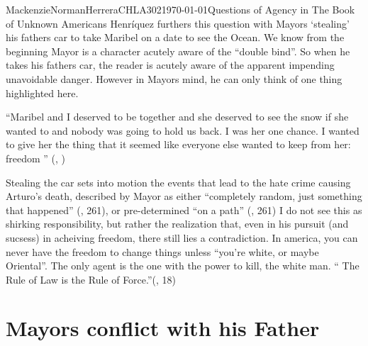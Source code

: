 \documentclass{article}
\begin{document}
\begin{mla}{Mackenzie}{Norman}{Herrera}{CHLA302}{\today}{Questions of Agency in The Book of Unknown Americans}
Henríquez furthers this question with Mayors `stealing' his fathers car to take Maribel on a date to see the Ocean. We know from the beginning Mayor is a character acutely aware of the ``double bind''.  So when he takes his fathers car, the reader is acutely aware of the apparent impending unavoidable danger. However in Mayors mind, he can only think of one thing highlighted here.

``Maribel and I deserved to be together and she deserved to see the snow if she wanted to and nobody was going to hold us back. I was her one chance. I wanted to give her the thing that it seemed like everyone else wanted to keep from her: freedom '' (\cite{Henriquez2014-sh}, )

Stealing the car sets into motion the events that lead to the hate crime causing Arturo's death, described by Mayor as either ``completely random, just something that happened'' (\cite{Henriquez2014-sh}, 261), or pre-determined ``on a path'' (\cite{Henriquez2014-sh}, 261) I do not see this as shirking responsibility, but rather the realization that, even in his pursuit (and sucsess) in acheiving freedom, there still lies a contradiction. In america, you can never have the freedom to change things unless ``you're white, or maybe Oriental''. The only agent is the one with the power to kill, the white man. `` The Rule of Law is the Rule of Force.''(\cite{loves-bdy}, 18)

\section*{Mayors conflict with his Father}


\end{mla}
\end{document}
